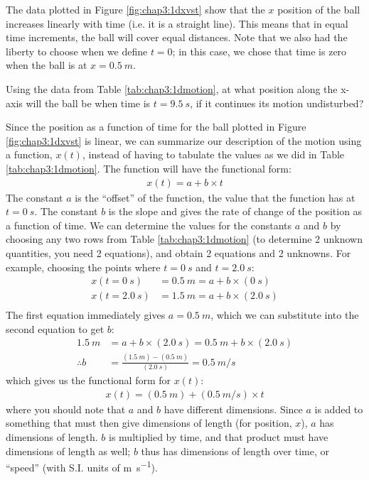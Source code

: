 The data plotted in Figure \ref{fig:chap3:1dxvst} show that the $x$ position of the ball increases linearly with time (i.e. it is a straight line). This means that in equal time increments, the ball will cover equal distances. Note that we also had the liberty to choose when we define $t=0$; in this case, we chose that time is zero when the ball is at $x=\SI{0.5}{m}$. 

\begin{checkpointSA}{Using the data from Table \ref{tab:chap3:1dmotion}, at what position along the x-axis will the ball be when time is $t=\SI{9.5}{s}$, if it continues its motion undisturbed?} %
\end{checkpointSA} 

Since the position as a function of time for the ball plotted in Figure \ref{fig:chap3:1dxvst} is linear, we can summarize our description of the motion using a function, $x(t)$, instead of having to tabulate the values as we did in Table \ref{tab:chap3:1dmotion}. The function will have the functional form:
\begin{align*}
x(t) = a + b\times t
\end{align*}
The constant $a$ is the ``offset'' of the function, the value that the function has at $t=\SI{0}{s}$. The constant $b$ is the slope and gives the rate of change of the position as a function of time. We can determine the values for the constants $a$ and $b$ by choosing any two rows from Table \ref{tab:chap3:1dmotion} (to determine 2 unknown quantities, you need 2 equations), and obtain 2 equations and 2 unknowns. For example, choosing the points where $t=\SI{0}{s}$ and $t=\SI{2.0}{s}$:
\begin{align*}
x(t=\SI{0}{s})&=\SI{0.5}{m}=a + b\times(\SI{0}{s}) \\
x(t=\SI{2.0}{s})&=\SI{1.5}{m}=a + b\times(\SI{2.0}{s}) \\
\end{align*}
The first equation immediately gives $a = \SI{0.5}{m}$, which we can substitute into the second equation to get $b$:
\begin{align*}
\SI{1.5}{m}&=a + b\times(\SI{2.0}{s}) = \SI{0.5}{m} + b\times(\SI{2.0}{s})\\
\therefore b &=\frac{(\SI{1.5}{m})-(\SI{0.5}{m})}{(\SI{2.0}{s})}=\SI{0.5}{m\per s}
\end{align*}
which gives us the functional form for $x(t)$:
\begin{align*}
x(t) = (\SI{0.5}{m}) + (\SI{0.5}{m\per s})\times t
\end{align*}
where you should note that $a$ and $b$ have different dimensions. Since $a$ is added to something that must then give dimensions of length (for position, $x$), $a$ has dimensions of length. $b$ is multiplied by time, and that product must have dimensions of length as well; $b$ thus has dimensions of length over time, or ``speed'' (with S.I. units of \si{m\per s}).

